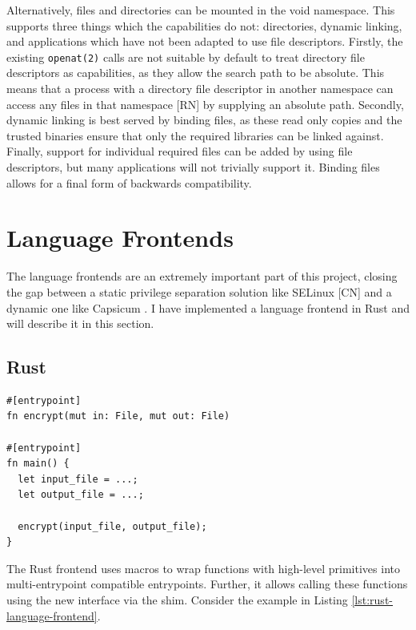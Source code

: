 \documentclass[sigplan]{acmart}
\begin{document}
Alternatively, files and directories can be mounted in the void namespace. This supports three things which the capabilities do not: directories, dynamic linking, and applications which have not been adapted to use file descriptors. Firstly, the existing \texttt{openat(2)} calls are not suitable by default to treat directory file descriptors as capabilities, as they allow the search path to be absolute. This means that a process with a directory file descriptor in another namespace can access any files in that namespace [RN] by supplying an absolute path. Secondly, dynamic linking is best served by binding files, as these read only copies and the trusted binaries ensure that only the required libraries can be linked against. Finally, support for individual required files can be added by using file descriptors, but many applications will not trivially support it. Binding files allows for a final form of backwards compatibility.

\section{Language Frontends}

The language frontends are an extremely important part of this project, closing the gap between a static privilege separation solution like SELinux [CN] and a dynamic one like Capsicum \citep{watson_capsicum_2010}. I have implemented a language frontend in Rust and will describe it in this section.

\subsection{Rust}

\begin{lstlisting}[float,label={lst:rust-language-frontend}]
#[entrypoint]
fn encrypt(mut in: File, mut out: File)

#[entrypoint]
fn main() {
  let input_file = ...;
  let output_file = ...;
  
  encrypt(input_file, output_file);
}
\end{lstlisting}

The Rust frontend uses macros to wrap functions with high-level primitives into multi-entrypoint compatible entrypoints. Further, it allows calling these functions using the new interface via the shim. Consider the example in Listing \ref{lst:rust-language-frontend}.
\end{document}
